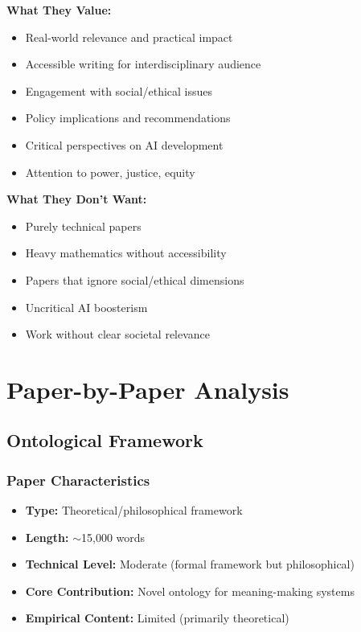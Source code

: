 \documentclass[12pt]{article}
\begin{document}
\textbf{What They Value:}
\begin{itemize}[leftmargin=*]
\item Real-world relevance and practical impact
\item Accessible writing for interdisciplinary audience
\item Engagement with social/ethical issues
\item Policy implications and recommendations
\item Critical perspectives on AI development
\item Attention to power, justice, equity
\end{itemize}

\textbf{What They Don't Want:}
\begin{itemize}[leftmargin=*]
\item Purely technical papers
\item Heavy mathematics without accessibility
\item Papers that ignore social/ethical dimensions
\item Uncritical AI boosterism
\item Work without clear societal relevance
\end{itemize}

\section{Paper-by-Paper Analysis}

\subsection{Ontological Framework}

\subsubsection{Paper Characteristics}

\begin{itemize}[leftmargin=*]
\item \textbf{Type:} Theoretical/philosophical framework
\item \textbf{Length:} $\sim$15,000 words
\item \textbf{Technical Level:} Moderate (formal framework but philosophical)
\item \textbf{Core Contribution:} Novel ontology for meaning-making systems
\item \textbf{Empirical Content:} Limited (primarily theoretical)
\end{itemize}
\end{document}
